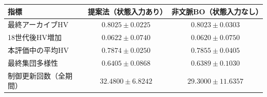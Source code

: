 \begin{tabular}{@{}lcc@{}}
\toprule
指標 & 提案法（状態入力あり） & 非文脈BO（状態入力なし） \\
\midrule
最終アーカイブHV & \(0.8025\pm0.0225\) & \(0.8023\pm0.0303\) \\
18世代後HV増加 & \(0.0622\pm0.0740\) & \(0.0620\pm0.0750\) \\
本評価中の平均HV & \(0.7874\pm0.0250\) & \(0.7855\pm0.0405\) \\
最終集団多様性 & \(0.6405\pm0.0868\) & \(0.6389\pm0.1030\) \\
制御更新回数（全期間） & \(32.4800\pm6.8242\) & \(29.3000\pm11.6357\) \\
\bottomrule
\end{tabular}
